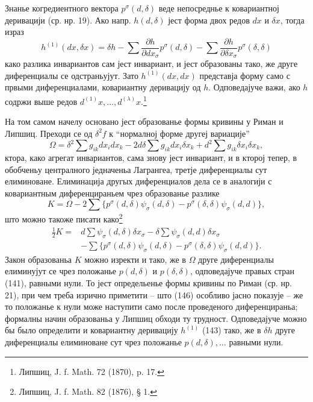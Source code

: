 ﻿\documentclass[11pt]{article}
\begin{document}
Знанье когредиентного вектора $p^\sigma(d,\delta)$ веде непосреднье к ковариантној деривацији (ср. нр. 19). Ако напр. $h(d,\delta)$ јест форма двох редов $dx$ и $\delta x$, тогда израз
\begin{equation}
 h^{(1)}(dx,\delta x)=\delta h-
 \sum\frac{\partial h}{\partial dx_\sigma}p^\sigma(d,\delta)-
 \sum\frac{\partial h}{\partial \delta x_\sigma}p^\sigma(\delta,\delta)
\tag{143}
\end{equation}
како разлика инвариантов сам јест инвариант, и јест образованы тако, же друге диференциалы се одстраньујут. Зато $h^{(1)}(dx,dx)$ представја форму само с првыми диференциалами, ковариантну деривацију од $h$. Одповедајуче важи, ако $h$ содржи выше редов $d^{(1)}x,\ldots,d^{(\lambda)}x$.\footnote{Липшиц, J. f. Math. 72 (1870), p. 17.}

На том самом начелу основано јест образованье формы кривины у Риман и Липшиц. Преходи се од $\delta^2 f$ к ``нормалној форме другеј вариације''
\begin{equation}
 \Omega=\delta^2\sum g_{ik}dx_i dx_k
 -2d\delta\sum g_{ik}dx_i\delta x_k
 +d^2\sum g_{ik}\delta x_i\delta x_k,
\tag{144}
\end{equation}
ктора, како агрегат инвариантов, сама знову јест инвариант, и в кторој тепер, в обобченьу централного једначеньа Лагрангеа, третје диференциалы сут елиминоване. Елиминација другых диференциалов дела се в аналогији с ковариантным диференцираньем чрез образованье разлике
\begin{equation}
 K=\Omega-2\sum\{p^\sigma(d,\delta)\psi_\sigma(d,\delta)-p^\sigma(\delta,\delta)\psi_\sigma(d,d)\},
\tag{145}
\end{equation}
што можно такоже писати како\footnote{Липшиц, J. f. Math. 82 (1876), § 1.}
\begin{equation}
\begin{aligned}
 \frac12 K={}&d\sum\psi_\sigma(d,\delta)\delta x_\sigma
 -\delta\sum\psi_\sigma(d,d)\delta x_\sigma\\
 &-\sum\{p^\sigma(d,\delta)\psi_\sigma(d,\delta)-p^\sigma(\delta,\delta)\psi_\sigma(d,d)\}.
\end{aligned}
\tag{146}
\end{equation}
Закон образованьа $K$ можно изректи и тако, же в $\Omega$ друге диференциалы елиминујут се чрез положанье $p(d,\delta)$ и $p(\delta,\delta)$, одповедајуче правых стран (141), равными нули. То јест определьенье формы кривины по Риман (ср. нр. 21), при чем треба изрично приметити -- што (146) особливо јасно показује -- же то положанье к нули може наступити само после проведеного диференцираньа; формалны начин образованьа у Липшиц обходи ту трудност. Одповедајуче можно бы было определити и ковариантну деривацију $h^{(1)}$ (143) тако, же в $\delta h$ друге диференциалы елиминоване сут чрез положанье $p(d,\delta),\ldots$ равными нули.
\end{document}
